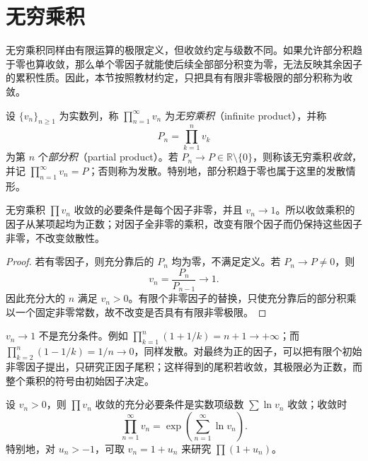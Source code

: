 \documentclass[UTF8,12pt,a4paper,fontset=fandol]{ctexbook}
\begin{document}
\section{无穷乘积}
\label{sec:infinite-products}

无穷乘积同样由有限运算的极限定义，但收敛约定与级数不同。如果允许部分积趋于零也算收敛，那么单个零因子就能使后续全部部分积变为零，无法反映其余因子的累积性质。因此，本节按照教材约定，只把具有有限非零极限的部分积称为收敛。

\begin{definition}
设 $\{v_n\}_{n\geq1}$ 为实数列，称 $\prod_{n=1}^{\infty}v_n$ 为\emph{无穷乘积}（infinite product），并称
\[
    P_n=\prod_{k=1}^n v_k
\]
为第 $n$ 个\emph{部分积}（partial product）。若 $P_n\to P\in\mathbb R\setminus\{0\}$，则称该无穷乘积\emph{收敛}，并记 $\prod_{n=1}^{\infty}v_n=P$；否则称为发散。特别地，部分积趋于零也属于这里的发散情形。
\end{definition}

\begin{proposition}
\label{prop:infinite-product-necessary-condition}
无穷乘积 $\prod v_n$ 收敛的必要条件是每个因子非零，并且 $v_n\to1$。所以收敛乘积的因子从某项起均为正数；对因子全非零的乘积，改变有限个因子而仍保持这些因子非零，不改变敛散性。
\end{proposition}

\begin{proof}
若有零因子，则充分靠后的 $P_n$ 均为零，不满足定义。若 $P_n\to P\neq0$，则
\[
    v_n=\frac{P_n}{P_{n-1}}\longrightarrow1.
\]
因此充分大的 $n$ 满足 $v_n>0$。有限个非零因子的替换，只使充分靠后的部分积乘以一个固定非零常数，故不改变是否具有有限非零极限。
\end{proof}

$v_n\to1$ 不是充分条件。例如
$\prod_{k=1}^n(1+1/k)=n+1\to+\infty$；而 $\prod_{k=2}^n(1-1/k)=1/n\to0$，同样发散。对最终为正的因子，可以把有限个初始非零因子提出，只研究正因子尾积；这样得到的尾积若收敛，其极限必为正数，而整个乘积的符号由初始因子决定。

\begin{theorem}[无穷乘积的对数判据]
\label{thm:infinite-product-logarithmic-criterion}
设 $v_n>0$，则 $\prod v_n$ 收敛的充分必要条件是实数项级数 $\sum\ln v_n$ 收敛；收敛时
\begin{equation}
    \prod_{n=1}^{\infty}v_n
      =\exp\left(\sum_{n=1}^{\infty}\ln v_n\right).
    \label{eq:infinite-product-logarithm}
\end{equation}
特别地，对 $u_n>-1$，可取 $v_n=1+u_n$ 来研究 $\prod(1+u_n)$。
\end{theorem}
\end{document}
